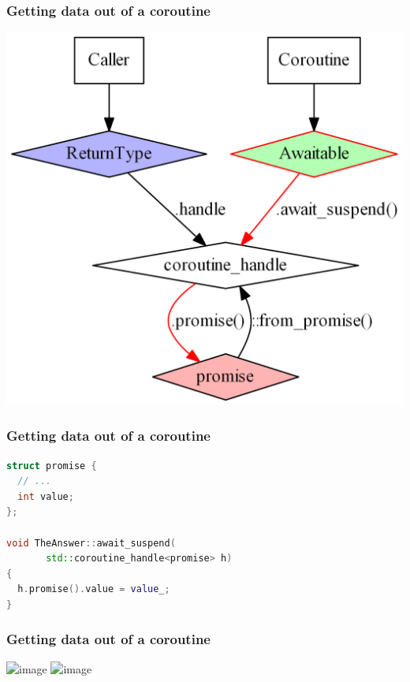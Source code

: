 \documentclass[aspectratio=169]{beamer}
\begin{document}
\begin{frame}[fragile]
  \frametitle{Getting data out of a coroutine}

  \begin{center}
  \includegraphics[height=.9\textheight]{corogfx/path_out_020.png}
  \end{center}
\end{frame}

\begin{frame}[fragile]
  \frametitle{Getting data out of a coroutine}
  
  \begin{lstlisting}[language={C++}]
struct promise {
  // ...
  int value;
};

void TheAnswer::await_suspend(
       std::coroutine_handle<promise> h)
{
  h.promise().value = value_;
}
  \end{lstlisting}
\end{frame}

\begin{frame}[fragile]
  \frametitle{Getting data out of a coroutine}

  \begin{center}
  \includegraphics<1>[height=.9\textheight]{corogfx/path_out_030.png}
  \includegraphics<2>[height=.9\textheight]{corogfx/path_out_040.png}
  \end{center}
\end{frame}
\end{document}
